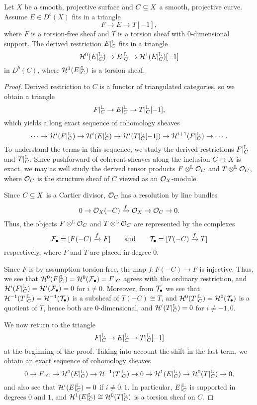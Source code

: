 \begin{lem}\label{restsingle} 
    Let $X$ be a smooth, projective surface and $C \subseteq X$ a smooth, projective curve. Assume $E \in D^b(X)$ fits in a triangle
    \[ F \to E \to T[-1], \]
    where $F$ is a torsion-free sheaf and $T$ is a torsion sheaf with 0-di\-men\-sion\-al support. The derived restriction $E|_C^{\mathbb{L}}$ fits in a triangle
    \[ \mathcal{H}^0(E|_C^{\mathbb{L}}) \to E|_C^{\mathbb{L}} \to \mathcal{H}^1(E|_C^{\mathbb{L}})[-1] \]
    in $D^b(C)$, where $\mathcal{H}^1(E|_C^{\mathbb{L}})$ is a torsion sheaf.
\end{lem}
\begin{proof}
Derived restriction to $C$ is a functor of triangulated categories, so we obtain a triangle
\[ F|_C^{\mathbb{L}} \to E|_C^{\mathbb{L}} \to T|_C^{\mathbb{L}}[-1], \]
which yields a long exact sequence of cohomology sheaves
\[ \cdots \to \mathcal{H}^i(F|_C^{\mathbb{L}}) \to \mathcal{H}^i(E|_C^{\mathbb{L}}) \to \mathcal{H}^i(T|_C^{\mathbb{L}}[-1]) \to \mathcal{H}^{i+1}(F|_C^{\mathbb{L}}) \to \cdots. \]
To understand the terms in this sequence, we study the derived restrictions $F|_C^{\mathbb{L}}$ and $T|_C^{\mathbb{L}}$. Since pushforward of coherent sheaves along the inclusion $C \hookrightarrow X$ is exact, we may as well study the derived tensor products $F \otimes^{\mathbb{L}} \mathcal{O}_C$ and $T \otimes^{\mathbb{L}} \mathcal{O}_C$, where $\mathcal{O}_C$ is the structure sheaf of $C$ viewed as an $\mathcal{O}_X$-module. 

Since $C \subseteq X$ is a Cartier divisor, $\mathcal{O}_C$ has a resolution by line bundles
\[ 0 \to \mathcal{O}_X(-C) \xrightarrow{f} \mathcal{O}_X \to \mathcal{O}_C \to 0. \]
Thus, the objects $F \otimes^{\mathbb{L}} \mathcal{O}_C$ and $T \otimes^{\mathbb{L}} \mathcal{O}_C$ are represented by the complexes
\[ \mathcal{F}_\bullet = [F(-C) \xrightarrow{f} F] \qquad \mathrm{and} \qquad \mathcal{T}_\bullet = [T(-C) \xrightarrow{f} T] \]
respectively, where $F$ and $T$ are placed in degree 0. 

Since $F$ is by assumption torsion-free, the map $f: F(-C) \to F$ is injective. Thus, we see that $\mathcal{H}^0(F|_C^{\mathbb{L}}) = \mathcal{H}^0(\mathcal{F}_\bullet) = F|_C$ agrees with the ordinary restriction, and $\mathcal{H}^i(F|_C^{\mathbb{L}}) = \mathcal{H}^i(\mathcal{F}_\bullet) = 0$ for $i \neq 0$. Moreover, from $\mathcal{T}_\bullet$ we see that $\mathcal{H}^{-1}(T|_C^{\mathbb{L}}) = \mathcal{H}^{-1}(\mathcal{T}_\bullet)$ is a subsheaf of $T(-C) \cong T$, and $\mathcal{H}^0(T|_C^{\mathbb{L}}) = \mathcal{H}^0(\mathcal{T}_\bullet)$ is a quotient of $T$, hence both are 0-dimensional, and $\mathcal{H}^i(T|_C^{\mathbb{L}}) = 0$ for $i \neq -1, 0$.

We now return to the triangle
\[ F|_C^{\mathbb{L}} \to E|_C^{\mathbb{L}} \to T|_C^{\mathbb{L}}[-1] \]
at the beginning of the proof. Taking into account the shift in the last term, we obtain an exact sequence of cohomology sheaves
\[ 0 \to F|_C \to \mathcal{H}^0(E|_C^{\mathbb{L}}) \to \mathcal{H}^{-1}(T|_C^{\mathbb{L}}) \to 0 \to \mathcal{H}^1(E|_C^{\mathbb{L}}) \to \mathcal{H}^0(T|_C^{\mathbb{L}}) \to 0, \]
and also see that $\mathcal{H}^i(E|_C^{\mathbb{L}}) = 0$ if $i \neq 0,1$. In particular, $E|_C^{\mathbb{L}}$ is supported in degrees $0$ and $1$, and $\mathcal{H}^1(E|_C^{\mathbb{L}}) \cong \mathcal{H}^0(T|_C^{\mathbb{L}})$ is a torsion sheaf on $C$.
\end{proof}

